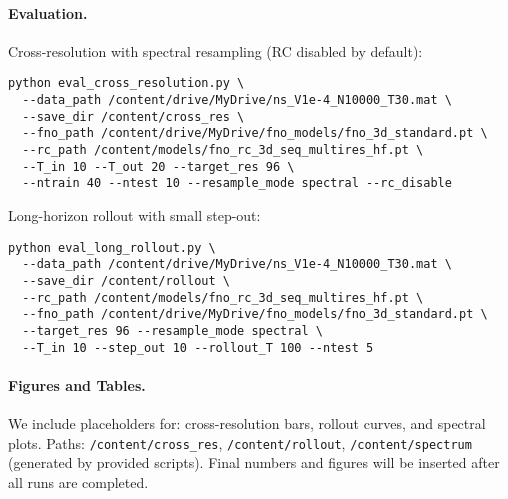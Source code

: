 \paragraph{Evaluation.} Cross-resolution with spectral resampling (RC disabled by default):
\begin{verbatim}
python eval_cross_resolution.py \
  --data_path /content/drive/MyDrive/ns_V1e-4_N10000_T30.mat \
  --save_dir /content/cross_res \
  --fno_path /content/drive/MyDrive/fno_models/fno_3d_standard.pt \
  --rc_path /content/models/fno_rc_3d_seq_multires_hf.pt \
  --T_in 10 --T_out 20 --target_res 96 \
  --ntrain 40 --ntest 10 --resample_mode spectral --rc_disable
\end{verbatim}

Long-horizon rollout with small step-out:
\begin{verbatim}
python eval_long_rollout.py \
  --data_path /content/drive/MyDrive/ns_V1e-4_N10000_T30.mat \
  --save_dir /content/rollout \
  --rc_path /content/models/fno_rc_3d_seq_multires_hf.pt \
  --fno_path /content/drive/MyDrive/fno_models/fno_3d_standard.pt \
  --target_res 96 --resample_mode spectral \
  --T_in 10 --step_out 10 --rollout_T 100 --ntest 5
\end{verbatim}

\paragraph{Figures and Tables.} We include placeholders for: cross-resolution bars, rollout curves, and spectral plots. Paths: \verb|/content/cross_res|, \verb|/content/rollout|, \verb|/content/spectrum| (generated by provided scripts). Final numbers and figures will be inserted after all runs are completed.



